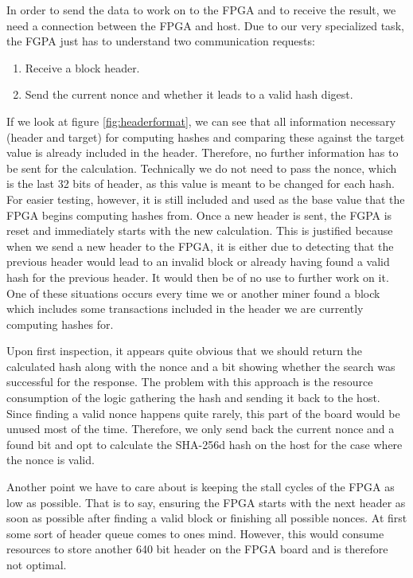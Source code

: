In order to send the data to work on to the FPGA and to receive the result, we need a connection between the FPGA and host.
Due to our very specialized task, the FGPA just has to understand two communication requests:

\begin{enumerate}
	\item Receive a block header.
	\item Send the current nonce and whether it leads to a valid hash digest.
\end{enumerate}

If we look at figure \ref{fig:headerformat}, we can see that all information necessary (header and target) for computing hashes and comparing these against the target value is already included in the header. 
Therefore, no further information has to be sent for the calculation. 
Technically we do not need to pass the nonce, which is the last 32 bits of header, as this value is meant to be changed for each hash. 
For easier testing, however, it is still included and used as the base value that the FPGA begins computing hashes from.
Once a new header is sent, the FGPA is reset and immediately starts with the new calculation.
This is justified because when we send a new header to the FPGA, it is either due to detecting that the previous header would lead to an invalid block or already having found a valid hash for the previous header.
It would then be of no use to further work on it.
One of these situations occurs every time we or another miner found a block which includes some transactions included in the header we are currently computing hashes for.

Upon first inspection, it appears quite obvious that we should return the calculated hash along with the nonce and a bit showing whether the search was successful for the response. 
The problem with this approach is the resource consumption of the logic gathering the hash and sending it back to the host.
Since finding a valid nonce happens quite rarely, this part of the board would be unused most of the time. 
Therefore, we only send back the current nonce and a found bit and opt to calculate the SHA-256d hash on the host for the case where the nonce is valid.

Another point we have to care about is keeping the stall cycles of the FPGA as low as possible. 
That is to say, ensuring the FPGA starts with the next header as soon as possible after finding a valid block or finishing all possible nonces. 
At first some sort of header queue comes to ones mind. However, this would consume resources to store another 640 bit header on the FPGA board and is therefore not optimal.

